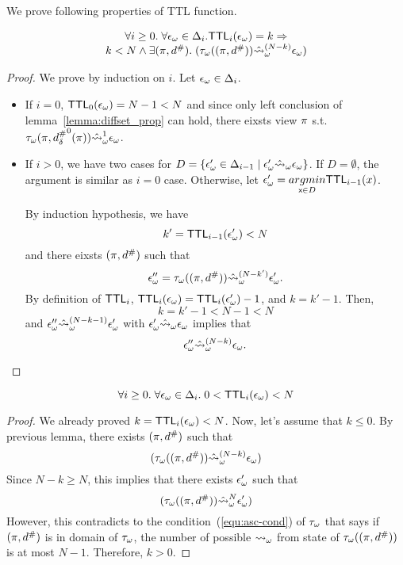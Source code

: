 We prove following properties of TTL function.
\begin{lemma}
  \[
    \begin{array}{c}
      \forall i \geq 0. \; \forall {\epsilon}_\omega \in \Delta_i.
      \textsf{TTL}_i({\epsilon}_\omega) = k \Rightarrow \\
      k < N \wedge
      \exists (\pi, {d}^{\#}). \; ({\tau}_\omega((\pi,{d}^{\#}))
      \hat{\leadsto}_\omega^{(N - k)} {\epsilon}_\omega) \\
    \end{array}
  \]
\end{lemma}
\begin{proof}
  We prove by induction on $i$.
  Let ${\epsilon}_\omega \in \Delta_i$.
  \begin{itemize}
  \item If $i = 0$, $\textsf{TTL}_0({\epsilon}_\omega) = N - 1 < N$
  and since only left conclusion of lemma~\ref{lemma:diffset_prop} can hold,
  there eixsts view $\pi$ s.t.
  ${\tau}_\omega(\pi, {{d}^{\#}_\delta}^0(\pi)) \hat{\leadsto}_\omega^1 {\epsilon}_\omega$.
  \item If $i > 0$, we have two cases for $D = 
    \{{\epsilon}_\omega' \in \Delta_{i-1} \mid {\epsilon}_\omega' \hat{\leadsto}_\omega {\epsilon}_\omega\}$.
  If $D = \emptyset$, the argument is similar as $i = 0$ case.
  Otherwise, let ${\epsilon}_\omega' = \underset{{\textsf{x}} \in D}{argmin}{\textsf{TTL}_{i-1}(x)}$.
  
  By induction hypothesis, we have
  \[
    k' = \textsf{TTL}_{i-1}({\epsilon}_\omega') < N
  \]
  and there eixsts $(\pi, {d}^{\#})$ such that
  \[
    {\epsilon}_\omega'' = {\tau}_\omega((\pi,{d}^{\#})) \hat{\leadsto}_\omega^{(N - k')} {\epsilon}_\omega'.
  \]
  By definition of $\textsf{TTL}_i$,
  $\textsf{TTL}_i({\epsilon}_\omega) = \textsf{TTL}_i({\epsilon}_\omega') - 1$, and $k = k' - 1$.
  Then,
  \[
    k = k' - 1 < N - 1 < N
  \]
  and
  ${\epsilon}_\omega'' \hat{\leadsto}_\omega^{(N - k - 1)} {\epsilon}_\omega'$ with
  ${\epsilon}_\omega' \hat{\leadsto}_\omega {\epsilon}_\omega$ implies that
  \[
    {\epsilon}_\omega'' \hat{\leadsto}_\omega^{(N - k)} {\epsilon}_\omega.
  \]
  \end{itemize}
\end{proof}
\begin{corollary}\label{corollary:ttl-range}
  \[
    \forall i \geq 0. \; \forall {\epsilon}_\omega \in \Delta_i. \;
    0 < \textsf{TTL}_i({\epsilon}_\omega) < N
  \]
\end{corollary}
\begin{proof}
We already proved $k = \textsf{TTL}_i({\epsilon}_\omega) < N$.
Now, let's assume that $k \leq 0$.
By previous lemma, there exists $(\pi, {d}^{\#})$ such that
\[
  ({\tau}_\omega((\pi,{d}^{\#})) \hat{\leadsto}_\omega^{(N - k)} {\epsilon}_\omega)
\]
Since $N - k \geq N$, this implies that there exists ${\epsilon}_\omega'$ such that
\[
  ({\tau}_\omega((\pi,{d}^{\#})) \hat{\leadsto}_\omega^N {\epsilon}_\omega')
\]
However, this contradicts to the condition~(\ref{equ:asc-cond}) of ${\tau}_\omega$ that says
if $(\pi,{d}^{\#})$ is in domain of ${\tau}_\omega$,
the number of possible ${\leadsto}_\omega$ from state of ${\tau}_\omega((\pi,{d}^{\#}))$
is at most $N - 1$.
Therefore, $k > 0$.
\end{proof}

